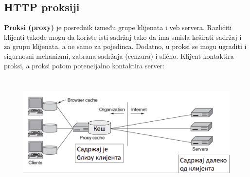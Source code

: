 \documentclass[a4paper]{article}
\begin{document}
    \subsection{HTTP proksiji}
        \textbf{Proksi (proxy)} je posrednik između grupe klijenata i veb servera. Različiti klijenti
        takođe mogu da koriste isti sadržaj tako da ima smisla keširati sadržaj i za grupu klijenata,
        a ne samo za pojedinca. Dodatno, u proksi se mogu ugraditi i sigurnosni mehanizmi,
        zabrana sadržaja (cenzura) i slično. Klijent kontaktira proksi, a proksi potom
        potencijalno kontaktira server:
        \begin{figure}[H]
            \begin{center}
                \includegraphics[width=120mm,height=60mm]{Slike/http9.png}
            \end{center}
        \end{figure}
\end{document}
